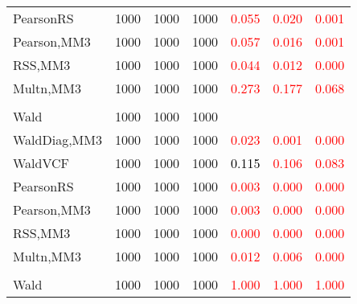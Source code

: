 \documentclass[
]{article}
\begin{document}
\begin{table}[H]
{\begin{tabular}[t]{lrrrrrr}
\hspace{1em}PearsonRS & 1000 & 1000 & 1000 & \textcolor{red}{0.055} & \textcolor{red}{0.020} & \textcolor{red}{0.001}\\
\hspace{1em}Pearson,MM3 & 1000 & 1000 & 1000 & \textcolor{red}{0.057} & \textcolor{red}{0.016} & \textcolor{red}{0.001}\\
\hspace{1em}RSS,MM3 & 1000 & 1000 & 1000 & \textcolor{red}{0.044} & \textcolor{red}{0.012} & \textcolor{red}{0.000}\\
\hspace{1em}Multn,MM3 & 1000 & 1000 & 1000 & \textcolor{red}{0.273} & \textcolor{red}{0.177} & \textcolor{red}{0.068}\\
\addlinespace[0.3em]
\multicolumn{7}{l}{\textbf{1F 15V}}\\
\hspace{1em}Wald & 1000 & 1000 & 1000 & \textcolor{black}{} & \textcolor{black}{} & \vphantom{1} \textcolor{black}{}\\
\hspace{1em}WaldDiag,MM3 & 1000 & 1000 & 1000 & \textcolor{red}{0.023} & \textcolor{red}{0.001} & \textcolor{red}{0.000}\\
\hspace{1em}WaldVCF & 1000 & 1000 & 1000 & \textcolor{black}{0.115} & \textcolor{red}{0.106} & \textcolor{red}{0.083}\\
\hspace{1em}PearsonRS & 1000 & 1000 & 1000 & \textcolor{red}{0.003} & \textcolor{red}{0.000} & \textcolor{red}{0.000}\\
\hspace{1em}Pearson,MM3 & 1000 & 1000 & 1000 & \textcolor{red}{0.003} & \textcolor{red}{0.000} & \textcolor{red}{0.000}\\
\hspace{1em}RSS,MM3 & 1000 & 1000 & 1000 & \textcolor{red}{0.000} & \textcolor{red}{0.000} & \vphantom{1} \textcolor{red}{0.000}\\
\hspace{1em}Multn,MM3 & 1000 & 1000 & 1000 & \textcolor{red}{0.012} & \textcolor{red}{0.006} & \textcolor{red}{0.000}\\
\addlinespace[0.3em]
\multicolumn{7}{l}{\textbf{2F 10V}}\\
\hspace{1em}Wald & 1000 & 1000 & 1000 & \textcolor{red}{1.000} & \textcolor{red}{1.000} & \textcolor{red}{1.000}\\

\end{tabular}}
\end{table}
\end{document}
